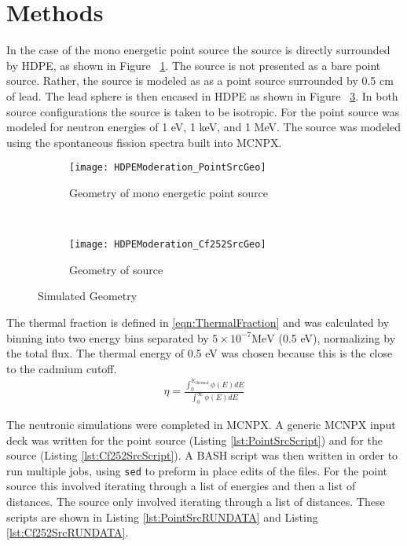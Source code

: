 \section{Methods}

In the case of the mono energetic point source the source is directly surrounded by HDPE, as shown in Figure ~\ref{fig:PointSrcGeo}. 
The  source is not presented as a bare point source.
Rather, the source is modeled as as a point  source surrounded by 0.5 cm of lead. The lead sphere is then encased in HDPE as shown in Figure ~\ref{fig:Cf252SrcGeo}.
In both source configurations the source is taken to be isotropic. 
For the point source was modeled for neutron energies of 1 eV, 1 keV, and 1 MeV.
The  source was modeled using the spontaneous fission spectra built into MCNPX.
\begin{figure}
  \centering
  \begin{subfigure}[b]{0.45\textwidth}
    \centering
    \texttt{[image: HDPEModeration\_PointSrcGeo]}
    \caption{Geometry of mono energetic point source}
    \label{fig:PointSrcGeo}
  \end{subfigure}%
  ~
  \begin{subfigure}[b]{0.45\textwidth}
    \centering
    \texttt{[image: HDPEModeration\_Cf252SrcGeo]}
    \caption{Geometry of  source}
    \label{fig:Cf252SrcGeo}
  \end{subfigure}
  \caption{Simulated Geometry}
\end{figure}

The thermal fraction is defined in \eqref{eqn:ThermalFraction} and was calculated by binning into two energy bins separated by $5\times10^{-7}\text{MeV}$ (0.5 eV), normalizing by the total flux.
The thermal energy of 0.5 eV was chosen because this is the close to the cadmium cutoff.
\begin{align}
    \label{eqn:ThermalFraction}
    \eta = \frac{\int_0 ^{E_\text{thermal}} \phi(E)dE}{\int_0^\infty \phi(E)dE}
\end{align}

The neutronic simulations were completed in MCNPX. 
A generic MCNPX input deck was written for the point source (Listing \ref{lst:PointSrcScript}) and for the  source (Listing \ref{lst:Cf252SrcScript}).
A BASH script was then written in order to run multiple jobs, using \verb+sed+ to preform in place edits of the files.
For the point source this involved iterating through a list of energies and then a list of distances.
The  source only involved iterating through a list of distances.
These scripts are shown in Listing \ref{lst:PointSrcRUNDATA} and Listing \ref{lst:Cf252SrcRUNDATA}.

